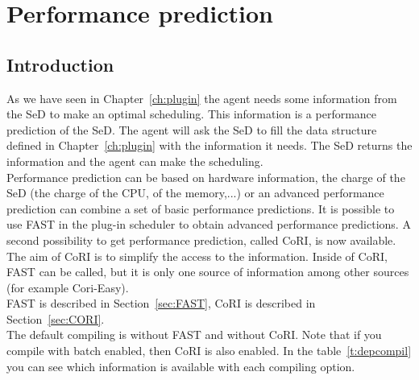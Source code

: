 
\chapter{Performance prediction}
\label{chapter:performance}
\section{Introduction}

As we have seen in Chapter~\ref{ch:plugin} the agent needs some
information from the SeD to make an optimal scheduling. This
information is a performance prediction of the SeD. The agent will ask
the SeD to fill the data structure defined in Chapter~\ref{ch:plugin}
with the information it needs. The SeD returns the information and the
agent can make the scheduling. \\ Performance prediction can be based
on hardware information, the charge of the SeD (the charge of the CPU,
of the memory,...) or an advanced performance prediction can combine
a set of basic performance predictions. It is possible to use FAST in
the plug-in scheduler to obtain advanced performance predictions. A
second possibility to get performance prediction, called CoRI, is now
available.  The aim of CoRI is to simplify the access to the
information. Inside of CoRI, FAST can be called, but it is only one
source of information among other sources (for example Cori-Easy). \\
FAST is described in Section~\ref{sec:FAST}, CoRI is described in
Section~\ref{sec:CORI}.\\ The default compiling is without FAST and
without CoRI. Note that if you compile with batch enabled, then CoRI
is also enabled.  In the table~\ref{t:depcompil} you can see which
information is available with each compiling option.

